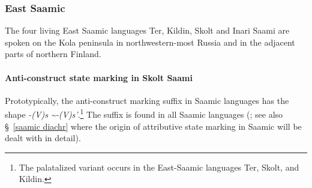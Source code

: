 \subsubsection{East Saamic}
The four living East Saamic languages Ter, Kildin, Skolt and Inari Saami are spoken on the Kola peninsula in northwestern-most Russia and in the adjacent parts of northern Finland.

\paragraph{Anti-construct state marking in Skolt Saami}%
Prototypically, the anti-construct marking suffix in Saamic languages has the shape \textit{-(V)s \textasciitilde-(V)s'}.\footnote{The palatalized variant occurs in the East-Saamic languages Ter, Skolt, and Kildin.} The suffix is found in all Saamic languages (\citealt{riesler2006b}; see also \S~\ref{saamic diachr} where the origin of attributive state marking in Saamic will be dealt with in detail). 

